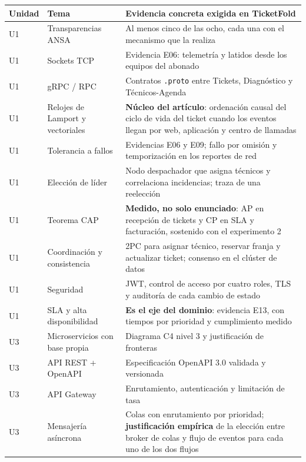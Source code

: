 \documentclass[11pt,a4paper]{article}
\begin{document}
\begin{center}
	\footnotesize
	\begin{longtable}{@{}p{1.2cm}p{5.2cm}p{8.4cm}@{}}
		\toprule
		\textbf{Unidad} & \textbf{Tema} & \textbf{Evidencia concreta exigida en TicketFold} \\
		\midrule
		\endhead
		U1 & Transparencias ANSA & Al menos cinco de las ocho, cada una con el mecanismo que la realiza \\
		U1 & Sockets TCP & Evidencia E06: telemetría y latidos desde los equipos del abonado \\
		U1 & gRPC / RPC & Contratos \texttt{.proto} entre Tickets, Diagnóstico y Técnicos-Agenda \\
		U1 & Relojes de Lamport y vectoriales & \textbf{Núcleo del artículo}: ordenación causal del ciclo de vida del ticket cuando los eventos llegan por web, aplicación y centro de llamadas \cite{lamport1978time} \\
		U1 & Tolerancia a fallos & Evidencias E06 y E09; fallo por omisión y temporización en los reportes de red \\
		U1 & Elección de líder & Nodo despachador que asigna técnicos y correlaciona incidencias; traza de una reelección \\
		U1 & Teorema CAP & \textbf{Medido, no solo enunciado}: AP en recepción de tickets y CP en SLA y facturación, sostenido con el experimento 2 \cite{gilbert2002brewer} \\
		U1 & Coordinación y consistencia & 2PC para asignar técnico, reservar franja y actualizar ticket; consenso en el clúster de datos \\
		U1 & Seguridad & JWT, control de acceso por cuatro roles, TLS y auditoría de cada cambio de estado \\
		U1 & SLA y alta disponibilidad & \textbf{Es el eje del dominio}: evidencia E13, con tiempos por prioridad y cumplimiento medido \\
		\addlinespace
		U3 & Microservicios con base propia & Diagrama C4 nivel 3 y justificación de fronteras \\
		U3 & API REST + OpenAPI & Especificación OpenAPI 3.0 validada y versionada \\
		U3 & API Gateway & Enrutamiento, autenticación y limitación de tasa \\
		U3 & Mensajería asíncrona & Colas con enrutamiento por prioridad; \textbf{justificación empírica} de la elección entre broker de colas y flujo de eventos para cada uno de los dos flujos \\

\end{longtable}
\end{center}
\end{document}
